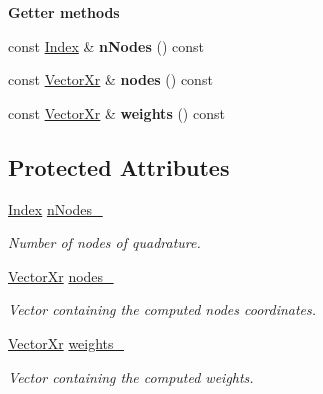 \begin{Indent}{\bf Getter methods}\par
\begin{DoxyCompactItemize}
\item 
\hypertarget{classQuadratureRule_a32e8457e19f3f8f4096e82a0cd759a03}{const \hyperlink{typedefs_8h_a2c726f8f32697958e9d6c2afecda531d}{Index} \& {\bfseries n\-Nodes} () const }\label{classQuadratureRule_a32e8457e19f3f8f4096e82a0cd759a03}

\item 
\hypertarget{classQuadratureRule_ac955b3953fe9174d6c9c4c9f519b4858}{const \hyperlink{typedefs_8h_aae6cee78ed9cd8f234ed8cb48682548a}{Vector\-Xr} \& {\bfseries nodes} () const }\label{classQuadratureRule_ac955b3953fe9174d6c9c4c9f519b4858}

\item 
\hypertarget{classQuadratureRule_a34502030990595ad6c2ededfb52383ae}{const \hyperlink{typedefs_8h_aae6cee78ed9cd8f234ed8cb48682548a}{Vector\-Xr} \& {\bfseries weights} () const }\label{classQuadratureRule_a34502030990595ad6c2ededfb52383ae}

\end{DoxyCompactItemize}
\end{Indent}
\subsection*{Protected Attributes}
\begin{DoxyCompactItemize}
\item 
\hypertarget{classQuadratureRule_a574676917a0d7d70140f4ed29bb1e8b4}{\hyperlink{typedefs_8h_a2c726f8f32697958e9d6c2afecda531d}{Index} \hyperlink{classQuadratureRule_a574676917a0d7d70140f4ed29bb1e8b4}{n\-Nodes\-\_\-}}\label{classQuadratureRule_a574676917a0d7d70140f4ed29bb1e8b4}

\begin{DoxyCompactList}\small\item\em Number of nodes of quadrature. \end{DoxyCompactList}\item 
\hypertarget{classQuadratureRule_af96d558adb075a6049017281e98fbed3}{\hyperlink{typedefs_8h_aae6cee78ed9cd8f234ed8cb48682548a}{Vector\-Xr} \hyperlink{classQuadratureRule_af96d558adb075a6049017281e98fbed3}{nodes\-\_\-}}\label{classQuadratureRule_af96d558adb075a6049017281e98fbed3}

\begin{DoxyCompactList}\small\item\em Vector containing the computed nodes coordinates. \end{DoxyCompactList}\item 
\hypertarget{classQuadratureRule_a35b6b677135284647f99765144b3af7a}{\hyperlink{typedefs_8h_aae6cee78ed9cd8f234ed8cb48682548a}{Vector\-Xr} \hyperlink{classQuadratureRule_a35b6b677135284647f99765144b3af7a}{weights\-\_\-}}\label{classQuadratureRule_a35b6b677135284647f99765144b3af7a}

\begin{DoxyCompactList}\small\item\em Vector containing the computed weights. \end{DoxyCompactList}\end{DoxyCompactItemize}
